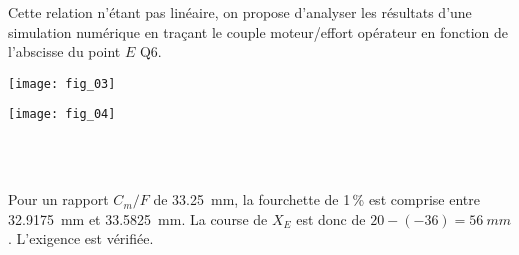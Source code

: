 


Cette relation n’étant pas linéaire, on propose d’analyser les résultats d’une
simulation numérique en traçant le couple moteur/effort opérateur en fonction de l’abscisse du point $E$
Q6.

\ifprof
\else
\begin{center}
\texttt{[image: fig\_03]}
\end{center}

\begin{center}
\texttt{[image: fig\_04]}
\end{center}

\fi
{}
\ifprof
\begin{corrige}~\\
\end{corrige}
\else
\fi


\ifprof
\begin{corrige}~\\
Pour un rapport $C_m/F$ de \SI{33,25}{mm}, la fourchette de 1\,\% est comprise entre \SI{32,9175}{mm} et \SI{33,5825}{mm}. La course de $X_E$ est donc de $20 - (-36)=\SI{56}{mm}$. L'exigence est vérifiée.
\end{corrige}
\else
\fi